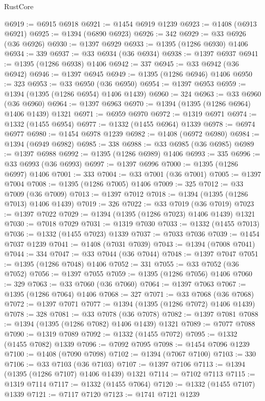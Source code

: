 \begin{lexlean}{RustCore}
\begin{coremodule}
@6919 := @6915 @6918
@6921 := @1454 @6919 @1239
@6923 := @1408 (@6913 @6921)
@6925 := @1394 (@6890 @6923)
@6926 := 342
@6929 := @33 @6926 (@36 @6926)
@6930 := @1397 @6929
@6933 := @1395 (@1286 @6930) @1406
@6934 := 339
@6937 := @33 @6934 (@36 @6934)
@6938 := @1397 @6937
@6941 := @1395 (@1286 @6938) @1406
@6942 := 337
@6945 := @33 @6942 (@36 @6942)
@6946 := @1397 @6945
@6949 := @1395 (@1286 @6946) @1406
@6950 := 323
@6953 := @33 @6950 (@36 @6950)
@6954 := @1397 @6953
@6959 := @1394 (@1395 (@1286 @6954) @1406 @1439)
@6960 := 324
@6963 := @33 @6960 (@36 @6960)
@6964 := @1397 @6963
@6970 := @1394 (@1395 (@1286 @6964) @1406 @1439) @1321
@6971 := @6959 @6970
@6972 := @1319 @6971
@6974 := @1332 (@1455 @6954)
@6977 := @1332 (@1455 @6964) @1339
@6978 := @6974 @6977
@6980 := @1454 @6978 @1239
@6982 := @1408 (@6972 @6980)
@6984 := @1394 (@6949 @6982)
@6985 := 338
@6988 := @33 @6985 (@36 @6985)
@6989 := @1397 @6988
@6992 := @1395 (@1286 @6989) @1406
@6993 := 335
@6996 := @33 @6993 (@36 @6993)
@6997 := @1397 @6996
@7000 := @1395 (@1286 @6997) @1406
@7001 := 333
@7004 := @33 @7001 (@36 @7001)
@7005 := @1397 @7004
@7008 := @1395 (@1286 @7005) @1406
@7009 := 325
@7012 := @33 @7009 (@36 @7009)
@7013 := @1397 @7012
@7018 := @1394 (@1395 (@1286 @7013) @1406 @1439)
@7019 := 326
@7022 := @33 @7019 (@36 @7019)
@7023 := @1397 @7022
@7029 := @1394 (@1395 (@1286 @7023) @1406 @1439) @1321
@7030 := @7018 @7029
@7031 := @1319 @7030
@7033 := @1332 (@1455 @7013)
@7036 := @1332 (@1455 @7023) @1339
@7037 := @7033 @7036
@7039 := @1454 @7037 @1239
@7041 := @1408 (@7031 @7039)
@7043 := @1394 (@7008 @7041)
@7044 := 334
@7047 := @33 @7044 (@36 @7044)
@7048 := @1397 @7047
@7051 := @1395 (@1286 @7048) @1406
@7052 := 331
@7055 := @33 @7052 (@36 @7052)
@7056 := @1397 @7055
@7059 := @1395 (@1286 @7056) @1406
@7060 := 329
@7063 := @33 @7060 (@36 @7060)
@7064 := @1397 @7063
@7067 := @1395 (@1286 @7064) @1406
@7068 := 327
@7071 := @33 @7068 (@36 @7068)
@7072 := @1397 @7071
@7077 := @1394 (@1395 (@1286 @7072) @1406 @1439)
@7078 := 328
@7081 := @33 @7078 (@36 @7078)
@7082 := @1397 @7081
@7088 := @1394 (@1395 (@1286 @7082) @1406 @1439) @1321
@7089 := @7077 @7088
@7090 := @1319 @7089
@7092 := @1332 (@1455 @7072)
@7095 := @1332 (@1455 @7082) @1339
@7096 := @7092 @7095
@7098 := @1454 @7096 @1239
@7100 := @1408 (@7090 @7098)
@7102 := @1394 (@7067 @7100)
@7103 := 330
@7106 := @33 @7103 (@36 @7103)
@7107 := @1397 @7106
@7113 := @1394 (@1395 (@1286 @7107) @1406 @1439) @1321
@7114 := @7102 @7113
@7115 := @1319 @7114
@7117 := @1332 (@1455 @7064)
@7120 := @1332 (@1455 @7107) @1339
@7121 := @7117 @7120
@7123 := @1741 @7121 @1239

\end{coremodule}
\end{lexlean}
